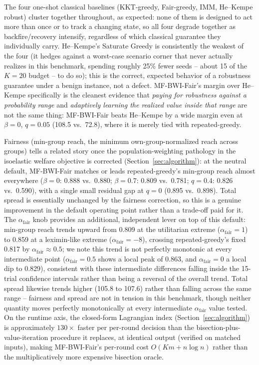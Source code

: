 \documentclass[journal]{IEEEtran}
\begin{document}
The four one-shot classical baselines (KKT-greedy, Fair-greedy, IMM,
He--Kempe robust) cluster together throughout, as expected: none of them
is designed to act more than once or to track a changing state, so all
four degrade together as backfire/recovery intensify, regardless of
which classical guarantee they individually carry. He--Kempe's Saturate
Greedy is consistently the weakest of the four (it hedges against a
worst-case scenario corner that never actually realizes in this
benchmark, spending roughly 25\% fewer seeds -- about 15 of the
$K=20$ budget -- to do so); this is the correct, expected behavior of a
robustness guarantee under a benign instance, not a defect. MF-BWI-Fair's
margin over He--Kempe specifically is the cleanest evidence that
\emph{paying for robustness against a probability range} and
\emph{adaptively learning the realized value inside that range} are not
the same thing: MF-BWI-Fair beats He--Kempe by a wide margin even at
$\beta=0$, $q=0.05$ (108.5 vs.\ 72.8), where it is merely tied with
repeated-greedy.

Fairness (min-group reach, the minimum own-group-normalized reach across
groups) tells a related story once the population-weighting pathology in
the isoelastic welfare objective is corrected (Section~\ref{sec:algorithm}):
at the neutral default, MF-BWI-Fair matches or leads repeated-greedy's
min-group reach almost everywhere ($\beta=0$: 0.888 vs.\ 0.880; $\beta=0.7$:
0.809 vs.\ 0.781; $q=0.4$: 0.826 vs.\ 0.590), with a single small residual
gap at $q=0$ (0.895 vs.\ 0.898). Total spread is essentially unchanged by
the fairness correction, so this is a genuine improvement in the
default operating point rather than a trade-off paid for it. The
$\alpha_{\mathrm{fair}}$ knob provides an additional, independent lever
on top of this default: min-group reach trends upward from 0.809 at the
utilitarian extreme ($\alpha_{\mathrm{fair}}=1$) to 0.859 at a
leximin-like extreme ($\alpha_{\mathrm{fair}}=-8$), crossing
repeated-greedy's fixed 0.817 by $\alpha_{\mathrm{fair}}\approx0.5$; we
note this trend is not perfectly monotonic at every intermediate point
($\alpha_{\mathrm{fair}}=0.5$ shows a local peak of 0.863, and
$\alpha_{\mathrm{fair}}=0$ a local dip to 0.829), consistent with these
intermediate differences falling inside the 15-trial confidence intervals
rather than being a reversal of the overall trend. Total spread likewise
trends higher (105.8 to 107.6) rather than falling across the same range
-- fairness and spread are not in tension in this benchmark, though
neither quantity moves perfectly monotonically at every intermediate
$\alpha_{\mathrm{fair}}$ value tested. On the runtime axis, the
closed-form Lagrangian index (Section~\ref{sec:algorithm}) is
approximately $130\times$ faster per per-round decision than the
bisection-plus-value-iteration procedure it replaces, at identical
output (verified on matched inputs), making MF-BWI-Fair's per-round cost
$O(Km+n\log n)$ rather than the multiplicatively more expensive
bisection oracle.
\end{document}
